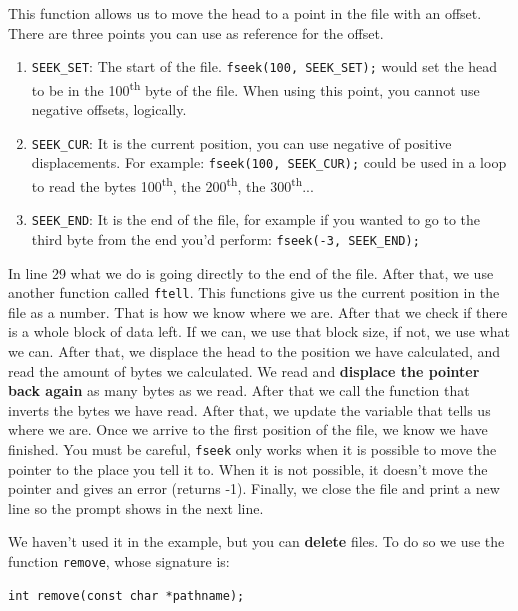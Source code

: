 \documentclass[a4paper]{article}
\begin{document}
This function allows us to move the head to a point in the file with an offset.
There are three points you can use as reference for the offset.
\begin{enumerate}
\item \verb!SEEK_SET!: The start of the file.
\verb!fseek(100, SEEK_SET);! would set the head to be in the
100\textsuperscript{th} byte of the file. When using this point, you cannot use
negative offsets, logically.
\item \verb!SEEK_CUR!: It is the current position, you can use negative of
positive displacements. For example: \verb!fseek(100, SEEK_CUR);! could be used
in a loop to read the bytes 100\textsuperscript{th},
the 200\textsuperscript{th}, the 300\textsuperscript{th}...
\item \verb!SEEK_END!: It is the end of the file, for example if you wanted to
go to the third byte from the end you'd perform: \verb!fseek(-3, SEEK_END);!
\end{enumerate}

In line 29 what we do is going directly to the end of the file. After that,
we use another function called \verb!ftell!. This functions give us the current
position in the file as a number. That is how we know where we are. After that
we check if there is a whole block of data left. If we can, we use that block
size, if not, we use what we can. After that, we displace the head to the
position we have calculated, and read the amount of bytes we calculated. We read
and \textbf{displace the pointer back again} as many bytes as we read. After
that we call the function that inverts the bytes we have read. After that,
we update the variable that tells us where we are. Once we arrive to the first
position of the file, we know we have finished. You must be careful,
\verb!fseek! only works when it is possible to move the pointer to the place you
tell it to. When it is not possible, it doesn't move the pointer and gives an
error (returns -1). Finally, we close the file and print a new line so the
prompt shows in the next line.

We haven't used it in the example, but you can \textbf{delete} files. To do so
we use the function \verb!remove!, whose signature is:

\noindent
\begin{minipage}[H]{\linewidth}
\mbox{}
\begin{lstlisting}[style=C,
caption={\texttt{remove} function signature},
label={lst:signatureRemove}]
int remove(const char *pathname);
\end{lstlisting}
\end{minipage}
\end{document}
